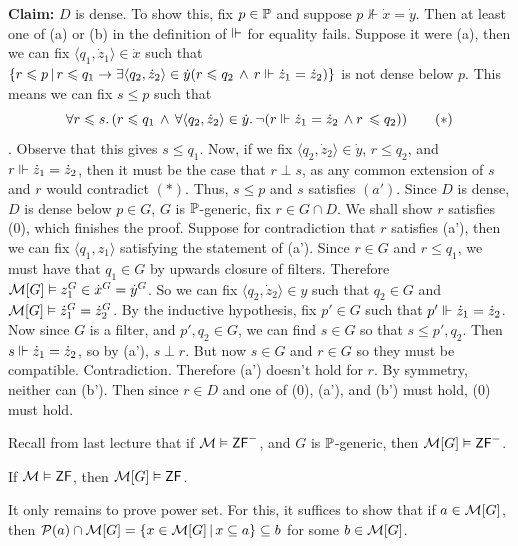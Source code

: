 \documentclass{article}
\begin{document}
\begin{enumerate}
              \textbf{Claim:} $D$ is dense. \gap To show this, fix $p \in \mathbb{P}$ and suppose $p \nVdash \dot{x} = \dot{y}$. Then at least one of (a) or (b) in the definition of $\Vdash$ for equality fails. Suppose it were (a), then we can fix $\langle q_{1}, \dot{z}_{1}\rangle \in \dot{x}$ such that $\{ r \leqslant p \, | \, r \leqslant q_{1} \rightarrow \exists \langle q_{2}, \dot{z}_{2} \rangle \in \dot{y} ( r \leqslant q_{2} \, \wedge \, r \Vdash \dot{z}_{1} = \dot{z}_{2}) \}$ is not dense below $p$. This means we can fix $s \leq p$ such that \[\forall r \leqslant s. \, (r \leqslant q_{1} \, \wedge \, \forall \langle q_{2}, \dot{z}_{2} \rangle \in \dot{y}. \, \neg(r \Vdash \dot{z}_{1} = \dot{z}_{2} \, \wedge r \, \leqslant q_{2})) \tag{$*$}\]. Observe that this gives $s \leq q_{1}$. Now, if we fix $\langle q_{2}, \dot{z}_{2} \rangle \in \dot{y}$, $r \leq q_{2}$, and $r \Vdash \dot{z}_{1} = \dot{z}_{2}$, then it must be the case that $r \perp s$, as any common extension of $s$ and $r$ would contradict $(*)$. Thus, $s \leq p$ and $s$ satisfies $(a')$. \gap
              Since $D$ is dense, $D$ is dense below $p \in G$, $G$ is $\mathbb{P}$-generic, fix $r \in G \cap D$. We shall show $r$ satisfies (0), which finishes the proof. Suppose for contradiction that $r$ satisfies (a'), then we can fix $\langle q_{1}, z_{1} \rangle$ satisfying the statement of (a'). Since $r \in G$ and $r \leq q_{1}$, we must have that $q_{1} \in G$ by upwards closure of filters. Therefore $\mathcal{M}[G] \vDash z_{1}^{G} \in \dot{x}^{G} = \dot{y}^{G}$. So we can fix $\langle q_{2}, \dot{z}_{2}\rangle \in y$ such that $q_{2} \in G$ and $\mathcal{M}[G] \vDash \dot{z}_{1}^{G} = \dot{z}_{2}^{G}$. By the inductive hypothesis, fix $p' \in G$ such that $p' \Vdash \dot{z}_{1} = \dot{z}_{2}$. Now since $G$ is a filter, and $p',q_{2} \in G$, we can find $s \in G$ so that $s \leq p',q_{2}$. Then $s \Vdash \dot{z}_{1} = \dot{z}_{2}$, so by (a'), $s \perp r$. But now $s \in G$ and $r \in G$ so they must be compatible. Contradiction. Therefore (a') doesn't hold for $r$. By symmetry, neither can (b'). Then since $r \in D$ and one of (0), (a'), and (b') must hold, (0) must hold.
    \end{enumerate}
    \endproof
    Recall from last lecture that if $\mathcal{M} \vDash \mathsf{ZF}^{-}$, and $G$ is $\mathbb{P}$-generic, then $\mathcal{M}[G] \vDash \mathsf{ZF}^{-}$.
    \begin{fancylem}{}
        If $\mathcal{M} \vDash \mathsf{ZF}$, then $\mathcal{M}[G] \vDash \mathsf{ZF}$.
    \end{fancylem}
    \proof It only remains to prove power set. For this, it suffices to show that if $a \in \mathcal{M}[G]$, then $\mathcal{P}(a) \cap \mathcal{M}[G] = \{ x \in \mathcal{M}[G] \, | \, x \subseteq a\} \subseteq b$ for some $b \in \mathcal{M}[G]$.\gap
\end{document}
